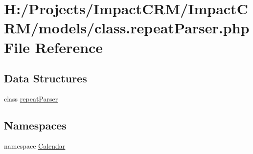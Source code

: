 \hypertarget{class_8repeatParser_8php}{
\section{H:/Projects/ImpactCRM/ImpactCRM/models/class.repeatParser.php File Reference}
\label{class_8repeatParser_8php}
}
\subsection*{Data Structures}
\begin{DoxyCompactItemize}
\item 
class \hyperlink{classrepeatParser}{repeatParser}
\end{DoxyCompactItemize}
\subsection*{Namespaces}
\begin{DoxyCompactItemize}
\item 
namespace \hyperlink{namespaceCalendar}{Calendar}
\end{DoxyCompactItemize}
